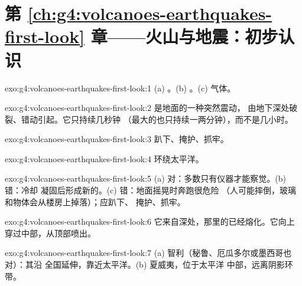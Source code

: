 \section*{第 \ref{ch:g4:volcanoes-earthquakes-first-look} 章——火山与地震：初步认识}

\begin{solution}{exo:g4:volcanoes-earthquakes-first-look:1}
(a) 。(b) 。(c) 气体。
\end{solution}

\begin{solution}{exo:g4:volcanoes-earthquakes-first-look:2}
是地面的一种突然震动，
由地下深处破裂、错动引起。它只持续几秒钟
（最大的也只持续一两分钟），而不是几小时。
\end{solution}

\begin{solution}{exo:g4:volcanoes-earthquakes-first-look:3}
趴下、掩护、抓牢。
\end{solution}

\begin{solution}{exo:g4:volcanoes-earthquakes-first-look:4}
环绕太平洋。
\end{solution}

\begin{solution}{exo:g4:volcanoes-earthquakes-first-look:5}
(a) 对：多数只有仪器才能察觉。(b) 错：冷却
凝固后形成新的。(c) 错：地面摇晃时奔跑很危险
（人可能摔倒，玻璃和物体会从楼房上掉落）；应趴下、
掩护、抓牢。
\end{solution}

\begin{solution}{exo:g4:volcanoes-earthquakes-first-look:6}
它来自深处，那里的已经熔化。它向上
穿过中部，从顶部喷出。
\end{solution}

\begin{solution}{exo:g4:volcanoes-earthquakes-first-look:7}
(a) 智利（秘鲁、厄瓜多尔或墨西哥也对）：其沿
全国延伸，靠近太平洋。(b) 夏威夷，位于太平洋
中部，远离阴影环带。
\end{solution}

